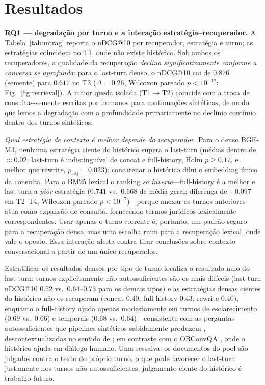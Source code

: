 \documentclass[conference]{IEEEtran}
\begin{document}
\section{Resultados}
\label{sec:results}
\textbf{RQ1 --- degradação por turno e a interação estratégia--recuperador.}
A Tabela~\ref{tab:mtrag} reporta o nDCG@10 por recuperador, estratégia e turno;
as estratégias coincidem no T1, onde não existe histórico. Sob ambos os
recuperadores, a qualidade da recuperação \emph{declina significativamente
conforme a conversa se aprofunda}: para o last-turn denso, o nDCG@10 cai de
$0.876$ (semente) para $0.617$ no T3 ($\Delta{=}0.26$, Wilcoxon pareado
$p<10^{-12}$; Fig.~\ref{fig:retrieval}). A maior queda isolada (T1$\to$T2)
coincide com a troca de consultas-semente escritas por humanos para
continuações sintéticas, de modo que lemos a degradação com a profundidade
primariamente no declínio contínuo dentro dos turnos sintéticos.

\emph{Qual estratégia de contexto é melhor depende do recuperador.} Para o
denso BGE-M3, nenhuma estratégia ciente do histórico supera o last-turn (médias
dentro de $\approx$0.02; last-turn é indistinguível de concat e full-history,
Holm $p\ge0.17$, e melhor que rewrite, $p_{\text{adj}}{=}0.023$): concatenar o
histórico dilui o embedding único da consulta. Para o BM25 lexical o ranking
\emph{se inverte}---full-history é a melhor e last-turn a \emph{pior} estratégia
($0.741$ vs.\ $0.668$ de média geral; diferença de $+0.097$ em T2--T4, Wilcoxon
pareado $p<10^{-7}$)---porque anexar os turnos anteriores atua como expansão de
consulta, fornecendo termos jurídicos lexicalmente correspondentes. Usar apenas
o turno corrente é, portanto, um padrão seguro para a recuperação densa, mas
uma escolha ruim para a recuperação lexical, onde vale o oposto. Essa interação
alerta contra tirar conclusões sobre contexto conversacional a partir de um
único recuperador.

Estratificar os resultados densos por tipo de turno localiza o resultado nulo
do last-turn: turnos explicitamente não autossuficientes são os mais difíceis
(last-turn nDCG@10 $0.52$ vs.\ $0.64$--$0.73$ para os demais tipos) e as
estratégias densas cientes do histórico não os recuperam (concat $0.40$,
full-history $0.43$, rewrite $0.40$), enquanto o full-history ajuda apenas
modestamente em turnos de esclarecimento ($0.69$ vs.\ $0.66$) e temporais
($0.68$ vs.\ $0.64$)---consistente com as perguntas autossuficientes que
pipelines sintéticos sabidamente produzem \cite{Vlachos2025Synthetic},
descontextualizadas no sentido de \cite{Choi2021Decontextualization}; em
contraste com o ORConvQA \cite{Qu2020ORConvQA}, onde o histórico ajuda em
diálogo humano. Uma ressalva: os documentos do pool são julgados contra o texto
do próprio turno, o que pode favorecer o last-turn justamente nos turnos não
autossuficientes; julgamento ciente do histórico é trabalho futuro.
\end{document}
